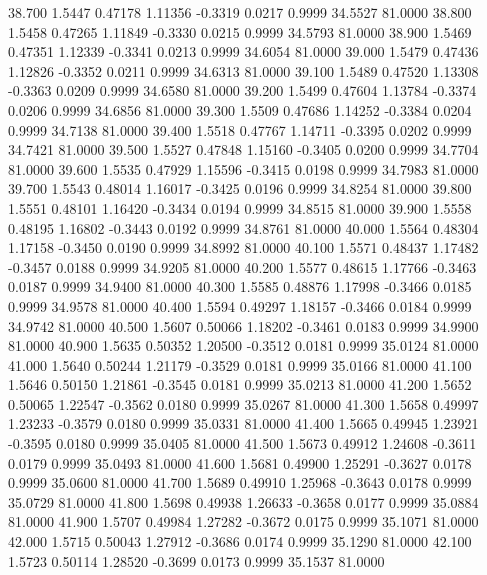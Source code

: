   38.700   1.5447   0.47178   1.11356  -0.3319   0.0217   0.9999  34.5527  81.0000
  38.800   1.5458   0.47265   1.11849  -0.3330   0.0215   0.9999  34.5793  81.0000
  38.900   1.5469   0.47351   1.12339  -0.3341   0.0213   0.9999  34.6054  81.0000
  39.000   1.5479   0.47436   1.12826  -0.3352   0.0211   0.9999  34.6313  81.0000
  39.100   1.5489   0.47520   1.13308  -0.3363   0.0209   0.9999  34.6580  81.0000
  39.200   1.5499   0.47604   1.13784  -0.3374   0.0206   0.9999  34.6856  81.0000
  39.300   1.5509   0.47686   1.14252  -0.3384   0.0204   0.9999  34.7138  81.0000
  39.400   1.5518   0.47767   1.14711  -0.3395   0.0202   0.9999  34.7421  81.0000
  39.500   1.5527   0.47848   1.15160  -0.3405   0.0200   0.9999  34.7704  81.0000
  39.600   1.5535   0.47929   1.15596  -0.3415   0.0198   0.9999  34.7983  81.0000
  39.700   1.5543   0.48014   1.16017  -0.3425   0.0196   0.9999  34.8254  81.0000
  39.800   1.5551   0.48101   1.16420  -0.3434   0.0194   0.9999  34.8515  81.0000
  39.900   1.5558   0.48195   1.16802  -0.3443   0.0192   0.9999  34.8761  81.0000
  40.000   1.5564   0.48304   1.17158  -0.3450   0.0190   0.9999  34.8992  81.0000
  40.100   1.5571   0.48437   1.17482  -0.3457   0.0188   0.9999  34.9205  81.0000
  40.200   1.5577   0.48615   1.17766  -0.3463   0.0187   0.9999  34.9400  81.0000
  40.300   1.5585   0.48876   1.17998  -0.3466   0.0185   0.9999  34.9578  81.0000
  40.400   1.5594   0.49297   1.18157  -0.3466   0.0184   0.9999  34.9742  81.0000
  40.500   1.5607   0.50066   1.18202  -0.3461   0.0183   0.9999  34.9900  81.0000
  40.900   1.5635   0.50352   1.20500  -0.3512   0.0181   0.9999  35.0124  81.0000
  41.000   1.5640   0.50244   1.21179  -0.3529   0.0181   0.9999  35.0166  81.0000
  41.100   1.5646   0.50150   1.21861  -0.3545   0.0181   0.9999  35.0213  81.0000
  41.200   1.5652   0.50065   1.22547  -0.3562   0.0180   0.9999  35.0267  81.0000
  41.300   1.5658   0.49997   1.23233  -0.3579   0.0180   0.9999  35.0331  81.0000
  41.400   1.5665   0.49945   1.23921  -0.3595   0.0180   0.9999  35.0405  81.0000
  41.500   1.5673   0.49912   1.24608  -0.3611   0.0179   0.9999  35.0493  81.0000
  41.600   1.5681   0.49900   1.25291  -0.3627   0.0178   0.9999  35.0600  81.0000
  41.700   1.5689   0.49910   1.25968  -0.3643   0.0178   0.9999  35.0729  81.0000
  41.800   1.5698   0.49938   1.26633  -0.3658   0.0177   0.9999  35.0884  81.0000
  41.900   1.5707   0.49984   1.27282  -0.3672   0.0175   0.9999  35.1071  81.0000
  42.000   1.5715   0.50043   1.27912  -0.3686   0.0174   0.9999  35.1290  81.0000
  42.100   1.5723   0.50114   1.28520  -0.3699   0.0173   0.9999  35.1537  81.0000
